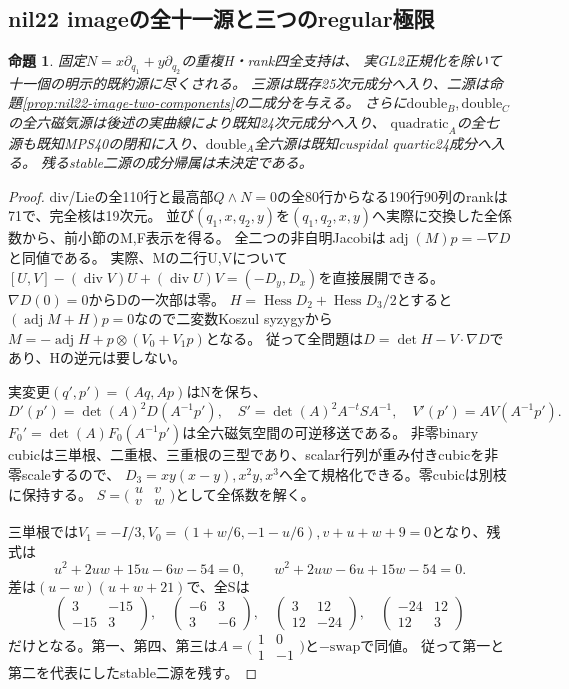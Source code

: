 \documentclass[a4paper,11pt]{ltjsarticle}
\newtheorem{proposition}{命題}[section]
\theoremstyle{definition}
\begin{document}
\subsection{nil22 imageの全十一源と三つのregular極限}
\begin{proposition}\label{prop:nil22-image-eleven}
固定$N=x\partial_{q_1}+y\partial_{q_2}$の重複H・rank四全支持は、
実GL2正規化を除いて十一個の明示的既約源に尽くされる。
三源は既存25次元成分へ入り、二源は命題\ref{prop:nil22-image-two-components}の二成分を与える。
さらに$\mathrm{double}_B,\mathrm{double}_C$の全六磁気源は後述の実曲線により既知24次元成分へ入り、
$\mathrm{quadratic}_A$の全七源も既知MPS40の閉和に入り、$\mathrm{double}_A$全六源は既知cuspidal quartic24成分へ入る。
残るstable二源の成分帰属は未決定である。
\end{proposition}
\begin{proof}
div/Lieの全110行と最高部$Q\wedge N=0$の全80行からなる190行90列のrankは71で、完全核は19次元。
並び$(q_1,x,q_2,y)$を$(q_1,q_2,x,y)$へ実際に交換した全係数から、前小節のM,F表示を得る。
全二つの非自明Jacobiは$\operatorname{adj}(M)p=-\nabla D$と同値である。
実際、Mの二行U,Vについて
$[U,V]-(\operatorname{div}V)U+(\operatorname{div}U)V=(-D_y,D_x)$を直接展開できる。
$\nabla D(0)=0$からDの一次部は零。
$H=\operatorname{Hess}D_2+\operatorname{Hess}D_3/2$とすると
$(\operatorname{adj}M+H)p=0$なので二変数Koszul syzygyから
$M=-\operatorname{adj}H+p\otimes(V_0+V_1p)$となる。
従って全問題は$D=\det H-V\cdot\nabla D$であり、Hの逆元は要しない。

実変更$(q',p')=(Aq,Ap)$はNを保ち、
\[
 D'(p')=\det(A)^2D(A^{-1}p'),\quad
 S'=\det(A)^2A^{-t}SA^{-1},\quad V'(p')=AV(A^{-1}p').
\]
$F_0'=\det(A)F_0(A^{-1}p')$は全六磁気空間の可逆移送である。
非零binary cubicは三単根、二重根、三重根の三型であり、scalar行列が重み付きcubicを非零scaleするので、
$D_3=xy(x-y),x^2y,x^3$へ全て規格化できる。零cubicは別枝に保持する。
$S=\bigl(\begin{smallmatrix}u&v\\v&w\end{smallmatrix}\bigr)$として全係数を解く。

三単根では$V_1=-I/3,V_0=(1+w/6,-1-u/6),v+u+w+9=0$となり、残式は
\[
 u^2+2uw+15u-6w-54=0,\qquad w^2+2uw-6u+15w-54=0.
\]
差は$(u-w)(u+w+21)$で、全Sは
\[
 \begin{pmatrix}3&-15\\-15&3\end{pmatrix},\quad
 \begin{pmatrix}-6&3\\3&-6\end{pmatrix},\quad
 \begin{pmatrix}3&12\\12&-24\end{pmatrix},\quad
 \begin{pmatrix}-24&12\\12&3\end{pmatrix}
\]
だけとなる。第一、第四、第三は$A=\bigl(\begin{smallmatrix}1&0\\1&-1\end{smallmatrix}\bigr)$と$-\mathrm{swap}$で同値。
従って第一と第二を代表にしたstable二源を残す。


\end{proof}
\end{document}
